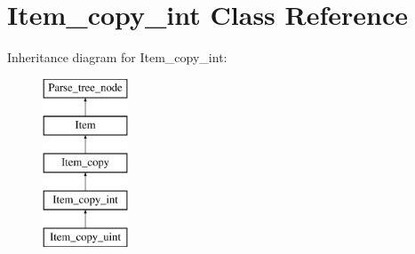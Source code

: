 \hypertarget{classItem__copy__int}{}\section{Item\+\_\+copy\+\_\+int Class Reference}
\label{classItem__copy__int}
Inheritance diagram for Item\+\_\+copy\+\_\+int\+:\begin{figure}[H]
\begin{center}
\leavevmode
\includegraphics[height=5.000000cm]{classItem__copy__int}
\end{center}
\end{figure}
